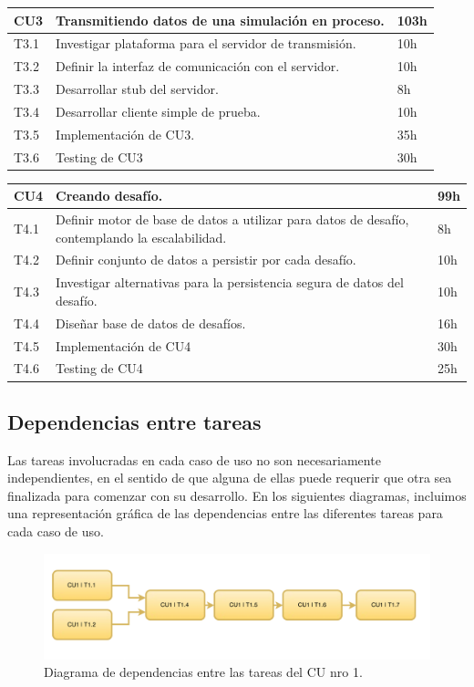 \documentclass[a4paper, 10pt, twoside]{article}
\begin{document}
\vspace{1em}

\begin{tabular}{lp{13cm}l}
  \hline
  CU3 & Transmitiendo datos de una simulación en proceso. & 103h \\
  \hline
  T3.1 & Investigar plataforma para el servidor de transmisión. & 10h \\
  T3.2 & Definir la interfaz de comunicación con el servidor. & 10h \\
  T3.3 & Desarrollar stub del servidor. & 8h \\
  T3.4 & Desarrollar cliente simple de prueba. & 10h \\
  T3.5 & Implementación de CU3. & 35h \\
  T3.6 & Testing de CU3 & 30h\\
  \hline
\end{tabular}

\vspace{1em}

\begin{tabular}{lp{13cm}l}
  \hline
  CU4 & Creando desafío. & 99h \\
  \hline
  T4.1 & Definir motor de base de datos a utilizar para datos de desafío, contemplando la escalabilidad. & 8h \\
  T4.2 & Definir conjunto de datos a persistir por cada desafío. & 10h \\
  T4.3 & Investigar alternativas para la persistencia segura de datos del desafío. & 10h \\
  T4.4 & Diseñar base de datos de desafíos. & 16h \\
  T4.5 & Implementación de CU4 & 30h\\
  T4.6 & Testing de CU4 & 25h\\
  \hline
\end{tabular}

\subsection{Dependencias entre tareas}

Las tareas involucradas en cada caso de uso no son necesariamente independientes, en el sentido de que alguna de ellas puede requerir que otra sea finalizada para comenzar con su desarrollo. En los siguientes diagramas, incluimos una representación gráfica de las dependencias entre las diferentes tareas para cada caso de uso.

\begin{center}
  \begin{figure}[h!]
    \includegraphics[width=15cm]{diagramas/diag-dependecias1.png}
    \caption{Diagrama de dependencias entre las tareas del CU nro 1.}
    \label{fig:diag-dependecias1}
  \end{figure}
\end{center}
\end{document}
